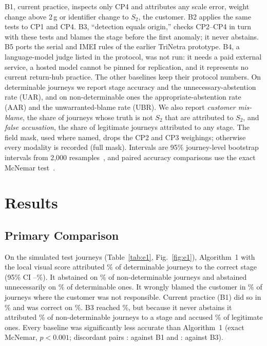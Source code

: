 \documentclass[conference]{IEEEtran}
\begin{document}
B1, current practice, inspects only CP4 and attributes any scale error, weight change above 2\,g or identifier change to $S_2$, the customer. B2 applies the same tests to CP1 and CP4. B3, ``detection equals origin,'' checks CP2--CP4 in turn with these tests and blames the stage before the first anomaly; it never abstains. B5 ports the serial and IMEI rules of the earlier TriNetra prototype. B4, a language-model judge listed in the protocol, was not run: it needs a paid external service, a hosted model cannot be pinned for replication, and it represents no current return-hub practice. The other baselines keep their protocol numbers. On determinable journeys we report stage accuracy and the unnecessary-abstention rate (UAR), and on non-determinable ones the appropriate-abstention rate (AAR) and the unwarranted-blame rate (UBR). We also report \emph{customer mis-blame}, the share of journeys whose truth is not $S_2$ that are attributed to $S_2$, and \emph{false accusation}, the share of legitimate journeys attributed to any stage. The field mask, used where named, drops the CP2 and CP3 weighings; otherwise every modality is recorded (full mask). Intervals are 95\% journey-level bootstrap intervals from 2,000 resamples~\cite{efron}, and paired accuracy comparisons use the exact McNemar test~\cite{mcnemar}.

\section{Results}\label{sec:results}
\subsection{Primary Comparison}
On the \NTest{} simulated test journeys (Table~\ref{tab:e1}, Fig.~\ref{fig:e1}), Algorithm~1 with the local visual score attributed \AlgAcc\% of determinable journeys to the correct stage (95\% CI \AlgAccLo--\AlgAccHi\%). It abstained on \AlgAAR\% of non-determinable journeys and abstained unnecessarily on \AlgUAR\% of determinable ones. It wrongly blamed the customer in \AlgMis\% of journeys where the customer was not responsible. Current practice (B1) did so in \BoneMis\% and was correct on \BoneAcc\%. B3 reached \BthreeAcc\%, but because it never abstains it attributed \BthreeUBR\% of non-determinable journeys to a stage and accused \BthreeFA\% of legitimate ones. Every baseline was significantly less accurate than Algorithm~1 (exact McNemar, $p<0.001$; discordant pairs \McBoneRef{}:\McBoneOther{} against B1 and \McBthreeRef{}:\McBthreeOther{} against B3).
\end{document}
